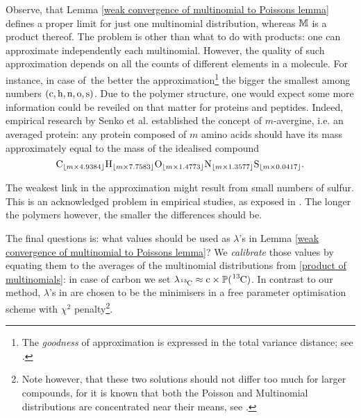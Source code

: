 Observe, that Lemma \ref{weak convergence of multinomial to Poissons lemma} defines a proper limit for just one multinomial distribution, whereas $\mathbb{M}$ is a product thereof. The problem is other than what to do with products: one can approximate independently each multinomial. However, the quality of such approximation depends on all the counts of different elements in a molecule. For instance, in case of \molecule\,the better the approximation\footnote{The {\it goodness} of approximation is expressed in the total variance distance; see \cite{Roos1999OnTheRateOfMultivariatePoissonConvergence}.} the bigger the smallest among numbers $(\cem{c}, \cem{h}, \cem{n}, \cem{o}, \cem{s})$. Due to the polymer structure, one would expect some more information could be reveiled on that matter for proteins and peptides. Indeed, empirical research by Senko et al. \cite{Senko1995Determination} established the concept of $m$-avergine, i.e. an averaged protein: any protein composed of $m$ amino acids should have its mass approximately equal to the mass of the idealised compound 
\begin{equation*}
	\cem{C}_{\lfloor m \times 4.9384\rfloor} 
	\cem{H}_{\lfloor m \times 7.7583\rfloor} 
	\cem{O}_{\lfloor m \times 1.4773\rfloor} 	
	\cem{N}_{\lfloor m \times 1.3577\rfloor} 
	\cem{S}_{\lfloor m \times 0.0417\rfloor}.
\end{equation*}

The weakest link in the approximation might result from small numbers of sulfur. This is an acknowledged problem in empirical studies, as exposed in \cite{Valkenborg2007UsingPoisson}. The longer the polymers however, the smaller the differences should be. 


The final questions is: what values should be used as $\lambda$'s in Lemma \ref{weak convergence of multinomial to Poissons lemma}? We {\it calibrate} those values by equating them to the averages of the multinomial distributions from \eqref{product of multinomials}: in case of carbon we set $\lambda_\cem{^{13}C} \approx \cem{c} \times \prob( \cem{^{13}C} )$.  In contrast to our method, $\lambda$'s in \cite{Breen2000AutomaticPeak,Valkenborg2007UsingPoisson} are chosen to be the minimisers in a free parameter optimisation scheme with $\chi^2$ penalty\footnote{Note however, that these two solutions should not differ too much for larger compounds, for it is known that both the Poisson and Multinomial distributions are concentrated near their means, see \cite{Bobkov1998OnModifiedLogarithmicSobolev}.}. 



